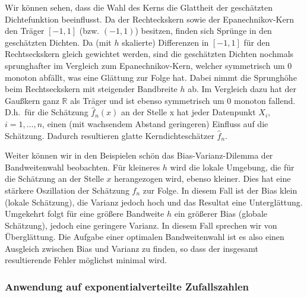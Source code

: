 \documentclass[10pt,]{article}
\begin{document}
Wir können sehen, dass die Wahl des Kerns die Glattheit der geschätzten
Dichtefunktion beeinflusst. Da der Rechteckskern sowie der
Epanechnikov-Kern den Träger \([-1,1]\) (bzw. \((-1,1)\)) besitzen,
finden sich Sprünge in den geschätzten Dichten. Da (mit \(h\) skalierte)
Differenzen in \([-1,1]\) für den Rechtseckskern gleich gewichtet
werden, sind die geschätzten Dichten nochmals sprunghafter im Vergleich
zum Epanechnikov-Kern, welcher symmetrisch um 0 monoton abfällt, was
eine Glättung zur Folge hat. Dabei nimmt die Sprunghöhe beim
Rechtseckskern mit steigender Bandbreite \(h\) ab. Im Vergleich dazu hat
der Gaußkern ganz \(\mathbb{R}\) als Träger und ist ebenso symmetrisch
um 0 monoton fallend. D.h.~für die Schätzung \(\hat{f}_n(x)\) an der
Stelle x hat jeder Datenpunkt \(X_i\), \(i = 1, \ldots,n\), einen (mit
wachsendem Abstand geringeren) Einfluss auf die Schätzung. Dadurch
resultieren glatte Kerndichteschätzer \(\hat{f}_n\).

Weiter können wir in den Beispielen schön das Bias-Varianz-Dilemma der
Bandweitenwahl beobachten. Für kleineres \(h\) wird die lokale Umgebung,
die für die Schätzung an der Stelle \(x\) herangezogen wird, ebenso
kleiner. Dies hat eine stärkere Oszillation der Schätzung \(\hat{f}_n\)
zur Folge. In diesem Fall ist der Bias klein (lokale Schätzung), die
Varianz jedoch hoch und das Resultat eine Unterglättung. Umgekehrt folgt
für eine größere Bandweite \(h\) ein größerer Bias (globale Schätzung),
jedoch eine geringere Varianz. In diesem Fall sprechen wir von
Überglättung. Die Aufgabe einer optimalen Bandweitenwahl ist es also
einen Ausgleich zwischen Bias und Varianz zu finden, so dass der
insgesamt resultierende Fehler möglichst minimal wird.

\subsubsection{Anwendung auf exponentialverteilte
Zufallszahlen}\label{anwendung-auf-exponentialverteilte-zufallszahlen}
\end{document}
